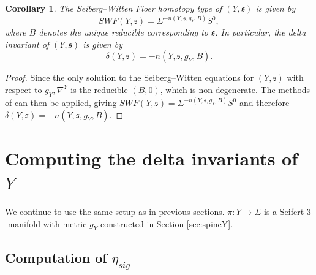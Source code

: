 \documentclass{amsart}
\newtheorem{corollary}[theorem]{Corollary}
\theoremstyle{definition}
\theoremstyle{remark}
\numberwithin{equation}{section}
\begin{document}
\begin{corollary}
The Seiberg--Witten Floer homotopy type of $(Y , \mathfrak{s})$ is given by
\[
SWF(Y , \mathfrak{s}) = \Sigma^{-n(Y , \mathfrak{s} , g_Y , B)} S^0,
\]
where $B$ denotes the unique reducible corresponding to $\mathfrak{s}$. In particular, the delta invariant of $(Y , \mathfrak{s})$ is given by
\[
\delta(Y , \mathfrak{s}) = -n(Y , \mathfrak{s} , g_Y , B).
\]
\end{corollary}
\begin{proof}
Since the only solution to the Seiberg--Witten equations for $(Y , \mathfrak{s})$ with respect to $g_Y, \nabla^Y$ is the reducible $(B,0)$, which is non-degenerate. The methods of \cite[-7]{man2} can then be applied, giving $SWF(Y , \mathfrak{s}) = \Sigma^{-n(Y , \mathfrak{s} , g_Y , B)} S^0$ and therefore $\delta(Y , \mathfrak{s}) = -n(Y , \mathfrak{s} , g_Y , B)$.
\end{proof} 





\section{Computing the delta invariants of $Y$}\label{sec:dY}

We continue to use the same setup as in previous sections. $\pi \colon Y \to \Sigma$ is a Seifert $3$-manifold with metric $g_Y$ constructed in Section \ref{sec:spincY}.

\subsection{Computation of $\eta_{sig}$}\label{sec:etasig}
\end{document}
